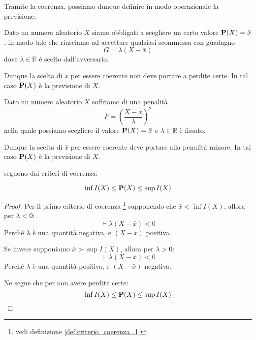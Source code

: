 Tramite la coerenza, possiamo dunque definire in modo operazionale la previsione:

\begin{definition}\label{def:criterio_coerenza_1_previsione}
  Dato un numero aleatorio $X$ siamo obbligati a scegliere un certo valore \( \mathbf{P}(X) = \bar{x} \), in modo tale che riusciamo ad accettare qualsiasi scommessa con guadagno
    \[ G = \lambda(X-\bar{x}) \]
  dove \( \lambda \in \mathbb{R} \) è scelto dall'avversario.

  Dunque la scelta di $\bar{x}$ per essere coerente non deve portare a perdite certe. In tal caso \( \mathbf{P}(X) \) è la previsione di $X$.
\end{definition}

\begin{definition}
  Dato un numero aleatorio $X$ soffriamo di una penalità
  \[ P = \left(\frac{X-\bar{x}}{\lambda}\right)^2 \]
  nella quale possiamo scegliere il valore \( \mathbf{P}(X) = \bar{x} \) e \( \lambda \in \mathbb{R} \) è fissato.

  Dunque la scelta di $\bar{x}$ per essere coerente deve portare alla penalità minore. In tal caso \( \mathbf{P}(X) \) è la previsione di $X$.
\end{definition}

 seguono dai criteri di coerenza:

\begin{proposition}\label{pro:monotonia_previsione}
  \[ \inf I(X) \leq \mathbf{P}(X) \leq \sup I(X) \]
\end{proposition}

\begin{proof}
  Per il primo criterio di coerenza
  \footnote{vedi definizione \ref{def:criterio_coerenza_1}}
  supponendo che \( \bar{x} < \inf I(X) \), allora per \( \lambda < 0 \):
  \[ \vdash \lambda(X - \bar{x}) < 0 \]
  Perché $\lambda$ è una quantità negativa, e \( (X - \bar{x}) \) positiva.

  Se invece supponiamo \( \bar{x} > \sup I(X) \), allora per \( \lambda > 0 \):
  \[ \vdash \lambda(X - \bar{x}) < 0 \]
  Perché $\lambda$ è una quantità positiva, e \( (X - \bar{x}) \) negativa.

  Ne segue che per non avere perdite certe:
  \[ \inf I(X) \leq \mathbf{P}(X) \leq \sup I(X) \]
\end{proof}

